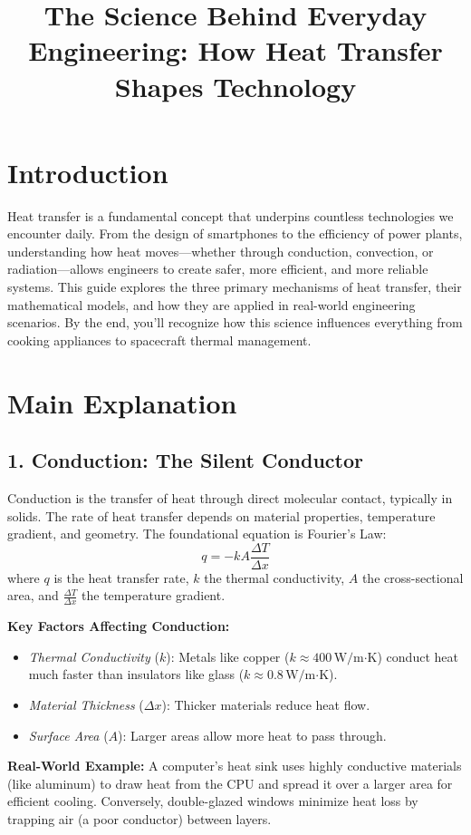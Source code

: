 \documentclass[12pt]{article}
\title{The Science Behind Everyday Engineering: How Heat Transfer Shapes Technology}
\author{}
\date{}
\begin{document}
\maketitle

\section*{Introduction}
Heat transfer is a fundamental concept that underpins countless technologies we encounter daily. From the design of smartphones to the efficiency of power plants, understanding how heat moves—whether through conduction, convection, or radiation—allows engineers to create safer, more efficient, and more reliable systems. This guide explores the three primary mechanisms of heat transfer, their mathematical models, and how they are applied in real-world engineering scenarios. By the end, you'll recognize how this science influences everything from cooking appliances to spacecraft thermal management.

\section*{Main Explanation}
\subsection*{1. Conduction: The Silent Conductor}
Conduction is the transfer of heat through direct molecular contact, typically in solids. The rate of heat transfer depends on material properties, temperature gradient, and geometry. The foundational equation is Fourier's Law:
$$
q = -k A \frac{\Delta T}{\Delta x}
$$
where $ q $ is the heat transfer rate, $ k $ the thermal conductivity, $ A $ the cross-sectional area, and $ \frac{\Delta T}{\Delta x} $ the temperature gradient.

\textbf{Key Factors Affecting Conduction:}
\begin{itemize}
    \item \textit{Thermal Conductivity} ($ k $): Metals like copper ($ k \approx 400 \, \text{W/m·K} $) conduct heat much faster than insulators like glass ($ k \approx 0.8 \, \text{W/m·K} $).
    \item \textit{Material Thickness} ($ \Delta x $): Thicker materials reduce heat flow.
    \item \textit{Surface Area} ($ A $): Larger areas allow more heat to pass through.
\end{itemize}

\textbf{Real-World Example:} A computer's heat sink uses highly conductive materials (like aluminum) to draw heat from the CPU and spread it over a larger area for efficient cooling. Conversely, double-glazed windows minimize heat loss by trapping air (a poor conductor) between layers.
\end{document}
